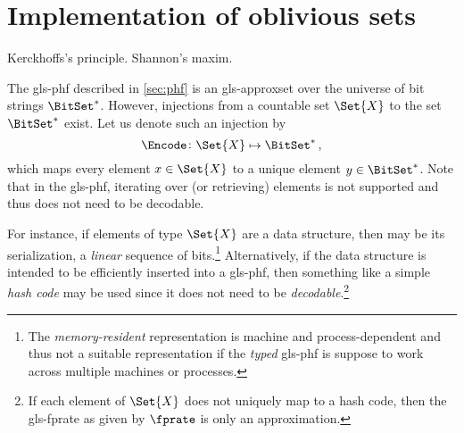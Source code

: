\documentclass[ ../main.tex]{subfiles}
\begin{document}
\section{Implementation of oblivious sets}
Kerckhoffs's principle. Shannon's maxim.

The \gls{gls-phf} described in \cref{sec:phf} is an \gls{gls-approxset} over the universe of bit strings $\BitSet^{*}$. However, injections from a countable set $\Set{X}$ to the set $\BitSet^{*}$ exist. Let us denote such an injection by
\begin{equation}
    \Encode \colon \Set{X} \mapsto \BitSet^{*}\,,
\end{equation}
which maps every element $x \in \Set{X}$ to a unique element $y \in \BitSet^{*}$. Note that in the \gls{gls-phf}, iterating over (or retrieving) elements is not supported and thus \Encode does not need to be decodable.

For instance, if elements of type $\Set{X}$ are a data structure, then \Encode may be its serialization, a \emph{linear} sequence of bits.\footnote{The \emph{memory-resident} representation is machine and process-dependent and thus not a suitable representation if the \emph{typed} \gls{gls-phf} is suppose to work across multiple machines or processes.} Alternatively, if the data structure is intended to be efficiently inserted into a \gls{gls-phf}, then something like a simple \emph{hash code} may be used since it does not need to be \emph{decodable}.\footnote{If each element of $\Set{X}$ does not uniquely map to a hash code, then the \gls{gls-fprate} as given by $\fprate$ is only an approximation.}
\end{document}
